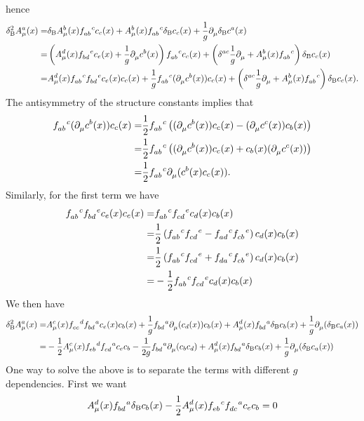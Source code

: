 hence
\begin{align*}
	\delta_{\text{B}}^{2}A_{\mu}^{a}(x) =& \delta_{\text{B}}A_{\mu}^{b}(x)\srconst{ab}{c}c_{c}(x) + A_{\mu}^{b}(x)\srconst{ab}{c}\delta_{\text{B}}c_{c}(x) + \frac{1}{g}\del{}{\mu}\delta_{\text{B}}c^{a}(x) \\
	=& \left(A_{\mu}^{d}(x)\srconst{bd}{e}c_{e}(x) + \frac{1}{g}\del{}{\mu}c^{b}(x)\right)\srconst{ab}{c}c_{c}(x) + \left(\kdelta{ac}{}\frac{1}{g}\del{}{\mu} + A_{\mu}^{b}(x)\srconst{ab}{c}\right)\delta_{\text{B}}c_{c}(x) \\
	=& A_{\mu}^{d}(x)\srconst{ab}{c}\srconst{bd}{e}c_{e}(x)c_{c}(x) + \frac{1}{g}\srconst{ab}{c}(\del{}{\mu}c^{b}(x))c_{c}(x) + \left(\kdelta{ac}{}\frac{1}{g}\del{}{\mu} + A_{\mu}^{b}(x)\srconst{ab}{c}\right)\delta_{\text{B}}c_{c}(x).
\end{align*}
The antisymmetry of the structure constants implies that
\begin{align*}
	\srconst{ab}{c}(\del{}{\mu}c^{b}(x))c_{c}(x) =& \frac{1}{2}\srconst{ab}{c}\left((\del{}{\mu}c^{b}(x))c_{c}(x) - (\del{}{\mu}c^{c}(x))c_{b}(x)\right) \\
	=& \frac{1}{2}\srconst{ab}{c}\left((\del{}{\mu}c^{b}(x))c_{c}(x) + c_{b}(x)(\del{}{\mu}c^{c}(x))\right) \\
	=& \frac{1}{2}\srconst{ab}{c}\del{}{\mu}(c^{b}(x)c_{c}(x)).
\end{align*}
Similarly, for the first term we have
\begin{align*}
	\srconst{ab}{c}\srconst{bd}{e}c_{e}(x)c_{c}(x) =& \srconst{ab}{c}\srconst{cd}{e}c_{d}(x)c_{b}(x) \\
	=& \frac{1}{2}\left(\srconst{ab}{c}\srconst{cd}{e} - \srconst{ad}{c}\srconst{cb}{e}\right)c_{d}(x)c_{b}(x) \\
	=& \frac{1}{2}\left(\srconst{ab}{c}\srconst{cd}{e} + \srconst{da}{c}\srconst{cb}{e}\right)c_{d}(x)c_{b}(x) \\
	=& -\frac{1}{2}\srconst{ab}{c}\srconst{cd}{e}c_{d}(x)c_{b}(x)
\end{align*}
We then have
\begin{align*}
	\delta_{\text{B}}^{2}A_{\mu}^{a}(x) =& A_{\mu}^{c}(x)\srconst{ec}{d}\srconst{bd}{a}c_{e}(x)c_{b}(x) + \frac{1}{g}\srconst{bd}{a}\del{}{\mu}(c_{d}(x))c_{b}(x) + A_{\mu}^{d}(x)\srconst{bd}{a}\delta_{\text{B}}c_{b}(x) + \frac{1}{g}\del{}{\mu}(\delta_{\text{B}}c_{a}(x)) \\
	=& -\frac{1}{2}A_{\mu}^{c}(x)\srconst{eb}{d}\srconst{cd}{a}c_{e}c_{b} - \frac{1}{2g}\srconst{bd}{a}\del{}{\mu}(c_{b}c_{d}) + A_{\mu}^{d}(x)\srconst{bd}{a}\delta_{\text{B}}c_{b}(x) + \frac{1}{g}\del{}{\mu}(\delta_{\text{B}}c_{a}(x))
\end{align*}
One way to solve the above is to separate the terms with different $g$ dependencies. First we want
\begin{align*}
	A_{\mu}^{d}(x)\srconst{bd}{a}\delta_{\text{B}}c_{b}(x) - \frac{1}{2}A_{\mu}^{d}(x)\srconst{eb}{c}\srconst{dc}{a}c_{e}c_{b} = 0
\end{align*}

